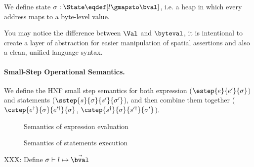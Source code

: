 We define state $\sigma: \State \eqdef [ l \gmapsto \bval ]$,
i.e. a heap in which every address maps to a byte-level value.

You may notice the difference between $\Val$ and $\byteval$, it is intentional to create a layer of abstraction for
easier manipulation of spatial assertions and also a clean, unified language syntax.

\paragraph{Small-Step Operational Semantics.}

We define the HNF small step semantics for both expression ($\estep{e}{e'}{\sigma}$) and statements ($\sstep{s}{\sigma}{s'}{\sigma'}$),
and then combine them together ($\cstep{e^\dag}{\sigma}{e'^\dag}{\sigma}$, $\cstep{s^\dag}{\sigma}{s'^\dag}{\sigma'}$).

\begin{figure}
\begin{mathpar}





\end{mathpar}
\caption{Semantics of expression evaluation}
\end{figure}

\begin{figure}
\begin{mathpar}




\end{mathpar}
\caption{Semantics of statements execution}
\end{figure}



XXX: Define $\sigma \vdash l \mapsto \vec \bval$

